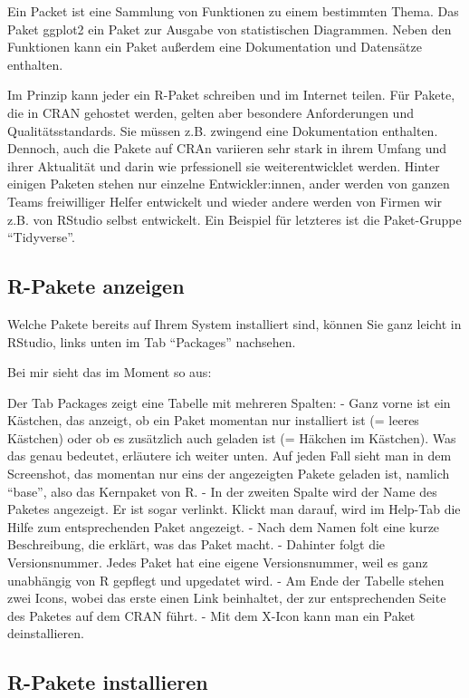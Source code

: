 \documentclass[
]{book}
\begin{document}
Ein Packet ist eine Sammlung von Funktionen zu einem bestimmten Thema. Das Paket ggplot2 ein Paket zur Ausgabe von statistischen Diagrammen. Neben den Funktionen kann ein Paket außerdem eine Dokumentation und Datensätze enthalten.

Im Prinzip kann jeder ein R-Paket schreiben und im Internet teilen. Für Pakete, die in CRAN gehostet werden, gelten aber besondere Anforderungen und Qualitätsstandards. Sie müssen z.B. zwingend eine Dokumentation enthalten. Dennoch, auch die Pakete auf CRAn variieren sehr stark in ihrem Umfang und ihrer Aktualität und darin wie prfessionell sie weiterentwicklet werden. Hinter einigen Paketen stehen nur einzelne Entwickler:innen, ander werden von ganzen Teams freiwilliger Helfer entwickelt und wieder andere werden von Firmen wir z.B. von RStudio selbst entwickelt. Ein Beispiel für letzteres ist die Paket-Gruppe ``Tidyverse''.

\hypertarget{r-pakete-anzeigen}{%
\subsection{R-Pakete anzeigen}\label{r-pakete-anzeigen}}

Welche Pakete bereits auf Ihrem System installiert sind, können Sie ganz leicht in RStudio, links unten im Tab ``Packages'' nachsehen.

Bei mir sieht das im Moment so aus:

Der Tab Packages zeigt eine Tabelle mit mehreren Spalten:
- Ganz vorne ist ein Kästchen, das anzeigt, ob ein Paket momentan nur installiert ist (= leeres Kästchen) oder ob es zusätzlich auch geladen ist (= Häkchen im Kästchen). Was das genau bedeutet, erläutere ich weiter unten. Auf jeden Fall sieht man in dem Screenshot, das momentan nur eins der angezeigten Pakete geladen ist, namlich ``base'', also das Kernpaket von R.
- In der zweiten Spalte wird der Name des Paketes angezeigt. Er ist sogar verlinkt. Klickt man darauf, wird im Help-Tab die Hilfe zum entsprechenden Paket angezeigt.
- Nach dem Namen folt eine kurze Beschreibung, die erklärt, was das Paket macht.
- Dahinter folgt die Versionsnummer. Jedes Paket hat eine eigene Versionsnummer, weil es ganz unabhängig von R gepflegt und upgedatet wird.
- Am Ende der Tabelle stehen zwei Icons, wobei das erste einen Link beinhaltet, der zur entsprechenden Seite des Paketes auf dem CRAN führt.
- Mit dem X-Icon kann man ein Paket deinstallieren.

\hypertarget{r-pakete-installieren}{%
\subsection{R-Pakete installieren}\label{r-pakete-installieren}}
\end{document}
